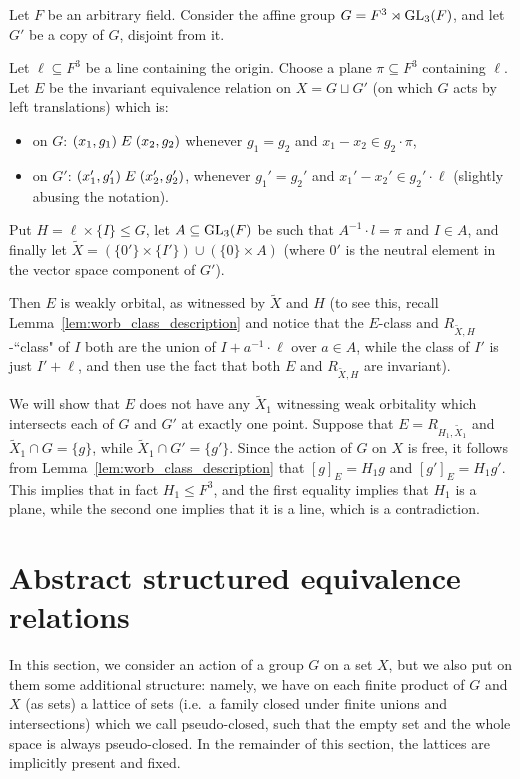 	\begin{ex}
		\label{ex:worb_nontrivial}
		Let $F$ be an arbitrary field. Consider the affine group $G=F^3\rtimes \operatorname{{GL}}_3(F)$, and let $G'$ be a copy of $G$, disjoint from it.
		
		Let $\ell\subseteq F^3$ be a line containing the origin. Choose a plane $\pi\subseteq F^3$ containing $\ell$. Let $E$ be the invariant equivalence relation on $X=G\sqcup G'$ (on which $G$ acts by left translations) which is:
		\begin{itemize}
			\item
			on $G$: $(x_1,g_1)\mathrel{E} (x_2,g_2)$ whenever $g_1=g_2$ and $x_1-x_2\in g_2\cdot \pi$,
			\item
			on $G'$: $(x_1',g_1')\mathrel{E} (x_2',g_2')$, whenever $g_1'=g_2'$ and $x_1'-x_2'\in g_2'\cdot \ell$ (slightly abusing the notation).
		\end{itemize}
		
		Put $H=\ell\times \{I\}\leq G$, let $A\subseteq \operatorname{{GL}}_3(F)$ be such that $A^{-1}\cdot l=\pi$ and $I\in A$, and finally let $\tilde X=(\{0'\}\times \{I'\})\cup (\{0\}\times A)$ (where $0'$ is the neutral element in the vector space component of $G'$).
		
		Then $E$ is weakly orbital, as witnessed by $\tilde X$ and $H$ (to see this, recall Lemma~\ref{lem:worb_class_description} and notice that the $E$-class and $R_{\tilde X,H}$-``class" of $I$ both are the union of $I+a^{-1}\cdot \ell$ over $a\in A$, while the class of $I'$ is just $I'+\ell$, and then use the fact that both $E$ and $R_{\tilde X,H}$ are invariant).
		
		We will show that $E$ does not have any $\tilde X_1$ witnessing weak orbitality which intersects each of $G$ and $G'$ at exactly one point. Suppose that $E=R_{H_1,\tilde X_1}$ and $\tilde X_1\cap G=\{g\}$, while $\tilde X_1\cap G'=\{g'\}$. Since the action of $G$ on $X$ is free, it follows from Lemma~\ref{lem:worb_class_description} that $[g]_E=H_1g$ and $[g']_E=H_1g'$. This implies that in fact $H_1\leq F^3$, and the first equality implies that $H_1$ is a plane, while the second one implies that it is a line, which is a contradiction.\xqed{\lozenge}
	\end{ex}
	
	
	\section{Abstract structured equivalence relations}
	\label{sec:structured}
	In this section, we consider an action of a group $G$ on a set $X$, but we also put on them some additional structure: namely, we have on each finite product of $G$ and $X$ (as sets) a lattice of sets (i.e.\ a family closed under finite unions and intersections) which we call pseudo-closed, such that the empty set and the whole space is always pseudo-closed. In the remainder of this section, the lattices are implicitly present and fixed.
	
